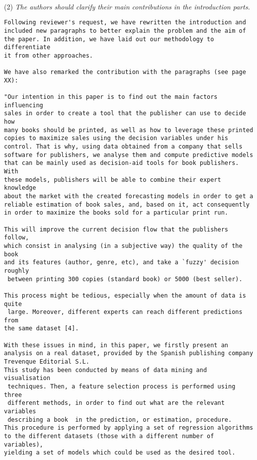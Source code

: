 \documentclass[preprint]{elsarticle}
\begin{document}
~\\
\noindent (2) \emph{The authors should clarify their main contributions in the introduction parts.}

\begin{verbatim}
Following reviewer's request, we have rewritten the introduction and 
included new paragraphs to better explain the problem and the aim of 
the paper. In addition, we have laid out our methodology to differentiate 
it from other approaches.

We have also remarked the contribution with the paragraphs (see page XX):

"Our intention in this paper is to find out the main factors influencing
sales in order to create a tool that the publisher can use to decide how 
many books should be printed, as well as how to leverage these printed
copies to maximize sales using the decision variables under his
control. That is why, using data obtained from a company that sells
software for publishers, we analyse them and compute predictive models 
that can be mainly used as decision-aid tools for book publishers. With 
these models, publishers will be able to combine their expert knowledge 
about the market with the created forecasting models in order to get a 
reliable estimation of book sales, and, based on it, act consequently 
in order to maximize the books sold for a particular print run. 

This will improve the current decision flow that the publishers follow, 
which consist in analysing (in a subjective way) the quality of the book 
and its features (author, genre, etc), and take a `fuzzy' decision roughly
 between printing 300 copies (standard book) or 5000 (best seller).

This process might be tedious, especially when the amount of data is quite
 large. Moreover, different experts can reach different predictions from 
the same dataset [4].

With these issues in mind, in this paper, we firstly present an 
analysis on a real dataset, provided by the Spanish publishing company 
Trevenque Editorial S.L.
This study has been conducted by means of data mining and visualisation
 techniques. Then, a feature selection process is performed using three
 different methods, in order to find out what are the relevant variables
 describing a book  in the prediction, or estimation, procedure. 
This procedure is performed by applying a set of regression algorithms 
to the different datasets (those with a different number of variables), 
yielding a set of models which could be used as the desired tool. 


\end{verbatim}
\end{document}
